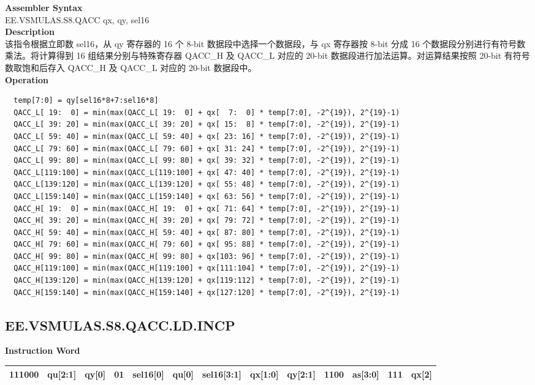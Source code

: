 \textbf{Assembler Syntax} \\
EE.VSMULAS.S8.QACC qx, qy, sel16 \\
\textbf{Description} \\
该指令根据立即数 sel16，从 qy 寄存器的 16 个 8-bit 数据段中选择一个数据段，与 qx 寄存器按 8-bit 分成 16 个数据段分别进行有符号数乘法。将计算得到 16 组结果分别与特殊寄存器 QACC\_H 及 QACC\_L 对应的 20-bit 数据段进行加法运算。对运算结果按照 20-bit 有符号数取饱和后存入 QACC\_H 及 QACC\_L 对应的 20-bit 数据段中。\\
\textbf{Operation}
\begin{lstlisting}
  temp[7:0] = qy[sel16*8+7:sel16*8]
  QACC_L[ 19:  0] = min(max(QACC_L[ 19:  0] + qx[  7:  0] * temp[7:0], -2^{19}), 2^{19}-1)
  QACC_L[ 39: 20] = min(max(QACC_L[ 39: 20] + qx[ 15:  8] * temp[7:0], -2^{19}), 2^{19}-1)
  QACC_L[ 59: 40] = min(max(QACC_L[ 59: 40] + qx[ 23: 16] * temp[7:0], -2^{19}), 2^{19}-1)
  QACC_L[ 79: 60] = min(max(QACC_L[ 79: 60] + qx[ 31: 24] * temp[7:0], -2^{19}), 2^{19}-1)
  QACC_L[ 99: 80] = min(max(QACC_L[ 99: 80] + qx[ 39: 32] * temp[7:0], -2^{19}), 2^{19}-1)
  QACC_L[119:100] = min(max(QACC_L[119:100] + qx[ 47: 40] * temp[7:0], -2^{19}), 2^{19}-1)
  QACC_L[139:120] = min(max(QACC_L[139:120] + qx[ 55: 48] * temp[7:0], -2^{19}), 2^{19}-1)
  QACC_L[159:140] = min(max(QACC_L[159:140] + qx[ 63: 56] * temp[7:0], -2^{19}), 2^{19}-1)
  QACC_H[ 19:  0] = min(max(QACC_H[ 19:  0] + qx[ 71: 64] * temp[7:0], -2^{19}), 2^{19}-1)
  QACC_H[ 39: 20] = min(max(QACC_H[ 39: 20] + qx[ 79: 72] * temp[7:0], -2^{19}), 2^{19}-1)
  QACC_H[ 59: 40] = min(max(QACC_H[ 59: 40] + qx[ 87: 80] * temp[7:0], -2^{19}), 2^{19}-1)
  QACC_H[ 79: 60] = min(max(QACC_H[ 79: 60] + qx[ 95: 88] * temp[7:0], -2^{19}), 2^{19}-1)
  QACC_H[ 99: 80] = min(max(QACC_H[ 99: 80] + qx[103: 96] * temp[7:0], -2^{19}), 2^{19}-1)
  QACC_H[119:100] = min(max(QACC_H[119:100] + qx[111:104] * temp[7:0], -2^{19}), 2^{19}-1)
  QACC_H[139:120] = min(max(QACC_H[139:120] + qx[119:112] * temp[7:0], -2^{19}), 2^{19}-1)
  QACC_H[159:140] = min(max(QACC_H[159:140] + qx[127:120] * temp[7:0], -2^{19}), 2^{19}-1)
\end{lstlisting}

\clearpage
\subsection{EE.VSMULAS.S8.QACC.LD.INCP}\label{instruction:EEVSMULASS8QACCLDINCP}
\setlength\tabcolsep{6pt}
\textbf{Instruction Word} \\
\begin{tabular}{|c|c|c|c|c|c|c|c|c|c|c|c|c|}
	\hline
	111000 & qu[2:1] & qy[0] & 01 & sel16[0] & qu[0] & sel16[3:1] & qx[1:0] & qy[2:1] & 1100 & as[3:0] & 111 & qx[2] \\
	\hline
\end{tabular}

